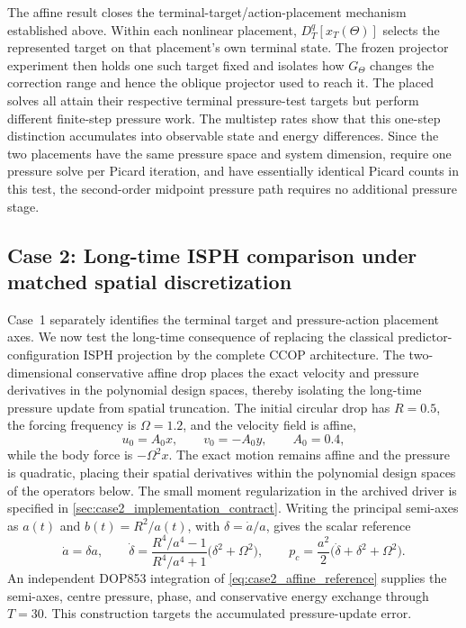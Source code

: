 \documentclass[11pt]{article}
\theoremstyle{plain}
\theoremstyle{definition}
\theoremstyle{remark}
\newcommand{\Th}{\Theta}
\begin{document}
The affine result closes the terminal-target/action-placement mechanism established above.  Within each nonlinear placement,
$D_T^q[x_T(\Th)]$ selects the represented target on that placement's own
terminal state.  The frozen projector experiment then holds one such target fixed and isolates
how $G_\Th$ changes the correction range and hence the oblique projector used
to reach it.  The placed solves all attain their respective terminal
pressure-test targets but perform different finite-step pressure work.  The
multistep rates show that this one-step distinction accumulates into observable
state and energy differences.  Since the two placements have the same pressure
space and system dimension, require one pressure solve per Picard iteration,
and have essentially identical Picard counts in this test, the second-order
midpoint pressure path requires no additional pressure stage.


\subsection{Case 2: Long-time ISPH comparison under matched spatial discretization}
\label{sec:result2}

Case~1 separately identifies the terminal target and pressure-action placement
axes.  We now test the long-time consequence of replacing the classical
predictor-configuration ISPH projection by the complete CCOP architecture.
The two-dimensional conservative affine drop places the exact velocity and
pressure derivatives in the polynomial design spaces, thereby isolating the
long-time pressure update from spatial truncation.  The
initial circular drop has $R=0.5$, the forcing frequency is $\Omega=1.2$, and
the velocity field is affine,
\begin{equation}
 u_0=A_0x,\qquad v_0=-A_0y,
 \qquad A_0=0.4,
 \label{eq:case2_affine_initial_velocity}
\end{equation}
while the body force is $-\Omega^2x$.  The exact motion remains affine and the
pressure is quadratic, placing their spatial derivatives within the polynomial
design spaces of the operators below.  The small moment regularization in the
archived driver is specified in \cref{sec:case2_implementation_contract}.
Writing the principal semi-axes as
$a(t)$ and $b(t)=R^2/a(t)$, with $\delta=\dot a/a$, gives the scalar reference
\begin{equation}
 \dot a=\delta a,
 \qquad
 \dot\delta=
 \frac{R^4/a^4-1}{R^4/a^4+1}
 \bigl(\delta^2+\Omega^2\bigr),
 \qquad
 p_c=\frac{a^2}{2}
 \bigl(\dot\delta+\delta^2+\Omega^2\bigr).
 \label{eq:case2_affine_reference}
\end{equation}
An independent DOP853 integration of \eqref{eq:case2_affine_reference} supplies
the semi-axes, centre pressure, phase, and conservative energy exchange through
$T=30$.  This construction targets the accumulated pressure-update error.
\end{document}
